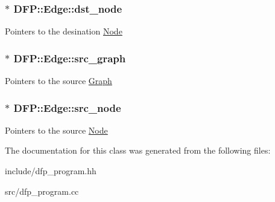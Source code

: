 \subsubsection[{\texorpdfstring{dst\+\_\+node}{dst_node}}]{$\ast$ D\+F\+P\+::\+Edge\+::dst\+\_\+node}\hypertarget{class_d_f_p_1_1_edge_a1c2dd4ca03c0dfa002a2d07dc738cfaa}{}\label{class_d_f_p_1_1_edge_a1c2dd4ca03c0dfa002a2d07dc738cfaa}
Pointers to the desination \hyperlink{class_d_f_p_1_1_node}{Node} 
\subsubsection[{\texorpdfstring{src\+\_\+graph}{src_graph}}]{$\ast$ D\+F\+P\+::\+Edge\+::src\+\_\+graph}\hypertarget{class_d_f_p_1_1_edge_a993e651548528b8cc2029d777cf2a881}{}\label{class_d_f_p_1_1_edge_a993e651548528b8cc2029d777cf2a881}
Pointers to the source \hyperlink{class_d_f_p_1_1_graph}{Graph} 
\subsubsection[{\texorpdfstring{src\+\_\+node}{src_node}}]{$\ast$ D\+F\+P\+::\+Edge\+::src\+\_\+node}\hypertarget{class_d_f_p_1_1_edge_a76f03300ad177e767033229d0fc1a780}{}\label{class_d_f_p_1_1_edge_a76f03300ad177e767033229d0fc1a780}
Pointers to the source \hyperlink{class_d_f_p_1_1_node}{Node} 

The documentation for this class was generated from the following files\+:\begin{DoxyCompactItemize}
\item 
include/dfp\+\_\+program.\+hh\item 
src/dfp\+\_\+program.\+cc\end{DoxyCompactItemize}
